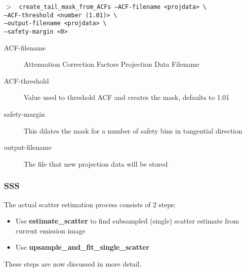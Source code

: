 \documentclass{article}
\newcommand{\cmdline}[1]{\par \noindent $>$ \texttt{#1}\par}
\begin{document}
\cmdline{%
create\_tail\_mask\_from\_ACFs		--ACF-filename <projdata> \textbackslash \\
					--ACF-threshold <number (1.01)> \textbackslash \\
					--output-filename <projdata> \textbackslash \\
					--safety-margin <0>%
}
\begin{description}
\item[ACF-filename] Attenuation Correction Factors Projection Data Filename
\item[ACF-threshold] Value used to threshold ACF and creates the mask, defaults to 1.01
\item[safety-margin] This dilates the mask for a number of safety bins in tangential direction
\item[output-filename] The file that new projection data will be stored
\end{description}

\subsubsection{SSS}
The actual scatter estimation process consists of $2$ steps:
\begin{itemize} 
\item Use \textbf{estimate\_scatter} to find subsampled (single) scatter estimate from current emission image
\item Use \textbf{upsample\_and\_fit\_single\_scatter}
\end{itemize} 
These steps are now discussed in more detail.\\[1cm]
\end{document}
